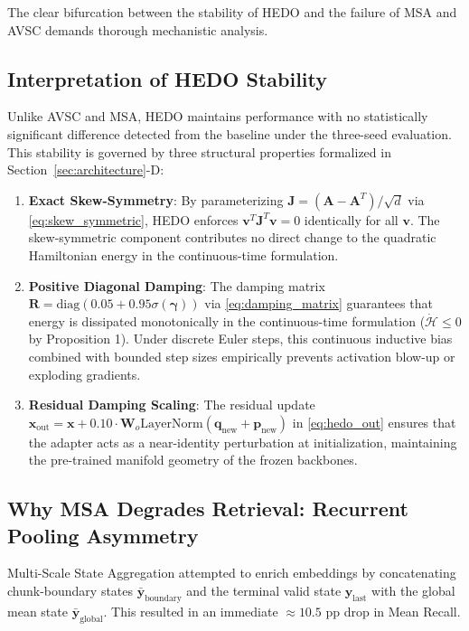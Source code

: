 \documentclass[conference]{IEEEtran}
\begin{document}
The clear bifurcation between the stability of HEDO and the failure of MSA and AVSC demands thorough mechanistic analysis.

\subsection{Interpretation of HEDO Stability}
Unlike AVSC and MSA, HEDO maintains performance with no statistically significant difference detected from the baseline under the three-seed evaluation. This stability is governed by three structural properties formalized in Section~\ref{sec:architecture}-D:
\begin{enumerate}
    \item \textbf{Exact Skew-Symmetry}: By parameterizing $\mathbf{J} = (\mathbf{A} - \mathbf{A}^T)/\sqrt{d}$ via \eqref{eq:skew_symmetric}, HEDO enforces $\mathbf{v}^T \mathbf{J}^T \mathbf{v} = 0$ identically for all $\mathbf{v}$. The skew-symmetric component contributes no direct change to the quadratic Hamiltonian energy in the continuous-time formulation.
    \item \textbf{Positive Diagonal Damping}: The damping matrix $\mathbf{R} = \mathrm{diag}(0.05 + 0.95\sigma(\boldsymbol{\gamma}))$ via \eqref{eq:damping_matrix} guarantees that energy is dissipated monotonically in the continuous-time formulation ($\dot{\mathcal{H}} \le 0$ by Proposition 1). Under discrete Euler steps, this continuous inductive bias combined with bounded step sizes empirically prevents activation blow-up or exploding gradients.
    \item \textbf{Residual Damping Scaling}: The residual update $\mathbf{x}_{\mathrm{out}} = \mathbf{x} + 0.10 \cdot \mathbf{W}_o \mathrm{LayerNorm}(\mathbf{q}_{\mathrm{new}} + \mathbf{p}_{\mathrm{new}})$ in \eqref{eq:hedo_out} ensures that the adapter acts as a near-identity perturbation at initialization, maintaining the pre-trained manifold geometry of the frozen backbones.
\end{enumerate}

\subsection{Why MSA Degrades Retrieval: Recurrent Pooling Asymmetry}
Multi-Scale State Aggregation attempted to enrich embeddings by concatenating chunk-boundary states $\bar{\mathbf{y}}_{\mathrm{boundary}}$ and the terminal valid state $\mathbf{y}_{\mathrm{last}}$ with the global mean state $\bar{\mathbf{y}}_{\mathrm{global}}$. This resulted in an immediate $\approx 10.5$ pp drop in Mean Recall.
\end{document}
